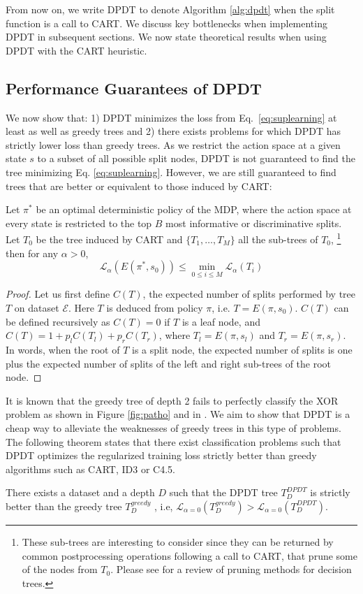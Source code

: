From now on, we write DPDT to denote Algorithm \ref{alg:dpdt} when the split function is a call to CART. We discuss key bottlenecks when implementing DPDT in subsequent sections. We now state theoretical results when using DPDT with the CART heuristic. 

\subsection{Performance Guarantees of DPDT}
We now show that: 1) DPDT minimizes the loss from Eq.~\ref{eq:suplearning} at least as well as greedy trees and 2) there exists problems for which DPDT has strictly lower loss than greedy trees. 
As we restrict the action space at a given state $s$ to a subset of all possible split nodes, DPDT is not guaranteed to find the tree minimizing Eq. \ref{eq:suplearning}. However, we are still guaranteed to find trees that are better or equivalent to those induced by CART:
\begin{theorem}\label{prop:cart}
Let $\pi^*$ be an optimal deterministic policy of the MDP, where the action space at every state is restricted to the top $B$ most informative or discriminative splits. 
Let $T_0$ be the tree induced by CART and $\{T_1,\dots,T_M\}$ all the sub-trees of $T_0$, \footnote{These sub-trees are interesting to consider since they can be returned by common postprocessing operations following a call to CART, that prune some of the nodes from $T_0$. Please see \cite{pruning1} for a review of pruning methods for decision trees.} then for any $\alpha > 0$, 
\[
{\mathcal L}_\alpha(E(\pi^*, s_0)) \leq \min_{0\leq i\leq M}{\mathcal L}_\alpha(T_i)
\]
\end{theorem}

\begin{proof}
Let us first define $C(T)$, the expected number of splits performed by tree $T$ on dataset $\mathcal E$. 
Here $T$ is deduced from policy $\pi$, i.e. $T=E(\pi, s_0)$. $C(T)$ can be defined recursively as $C(T) = 0$ if $T$ is a leaf node, and $C(T) = 1 + p_l C(T_l) + p_r  C(T_r)$, where $T_l = E(\pi, s_l)$ and $T_r = E(\pi, s_r)$. 
In words, when the root of $T$ is a split node, the expected number of splits is one plus the expected number of splits of the left and right sub-trees of the root node.
\end{proof}

It is known that the greedy tree of depth 2 fails to perfectly classify the XOR problem as shown in Figure \ref{fig:patho} and in \cite{Murthy,how-eff}. We aim to show that DPDT is a cheap way to alleviate the weaknesses of greedy trees in this type of problems. The following theorem states that there exist classification problems such that DPDT optimizes the regularized training loss strictly better than greedy algorithms such as CART, ID3 or C4.5.
\begin{theorem}\label{thm:better_greedy}
There exists a dataset and a depth $D$ such that the DPDT tree $T^{DPDT}_D$ is strictly better than the greedy tree $T^{greedy}_{D}$ , i.e, $\mathcal{L}_{\alpha=0}(T^{greedy}_{D}) > \mathcal{L}_{\alpha=0}(T^{DPDT}_{D})$.
\end{theorem}

